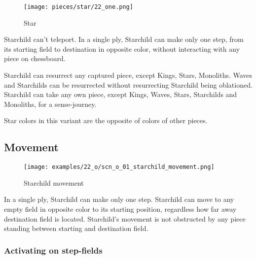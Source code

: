 \noindent
\begin{wrapfigure}[11]{l}{0.4\textwidth}
\centering
\texttt{[image: pieces/star/22\_one.png]}
\caption{Star}
\label{fig:star/22_one}
\end{wrapfigure}
Starchild can't teleport. In a single ply, Starchild can make only one step, from
its starting field to destination in opposite color, without interacting with any
piece on chessboard.

Starchild can resurrect any captured piece, except Kings, Stars, Monoliths. Waves
and Starchilds can be resurrected without resurrecting Starchild being oblationed.
Starchild can take any own piece, except Kings, Waves, Stars, Starchilds and
Monoliths, for a sense-journey.

Star colors in this variant are the opposite of colors of other pieces.

\clearpage %

\subsection*{Movement}
\label{sec:One/Starchild/Movement}

\vspace*{-0.9\baselineskip}
\noindent
\begin{wrapfigure}[9]{l}{0.4\textwidth}
\centering
\texttt{[image: examples/22\_o/scn\_o\_01\_starchild\_movement.png]}
\caption{Starchild movement}
\label{fig:scn_o_01_starchild_movement}
\end{wrapfigure}
In a single ply, Starchild can make only one step. Starchild can move to any empty
field in opposite color to its starting position, regardless how far away destination
field is located. Starchild's movement is not obstructed by any piece standing between
starting and destination field.

\vspace*{-0.9\baselineskip}
\subsubsection*{Activating on step-fields}
\label{sec:One/Starchild/Movement/Activating on step-fields}

